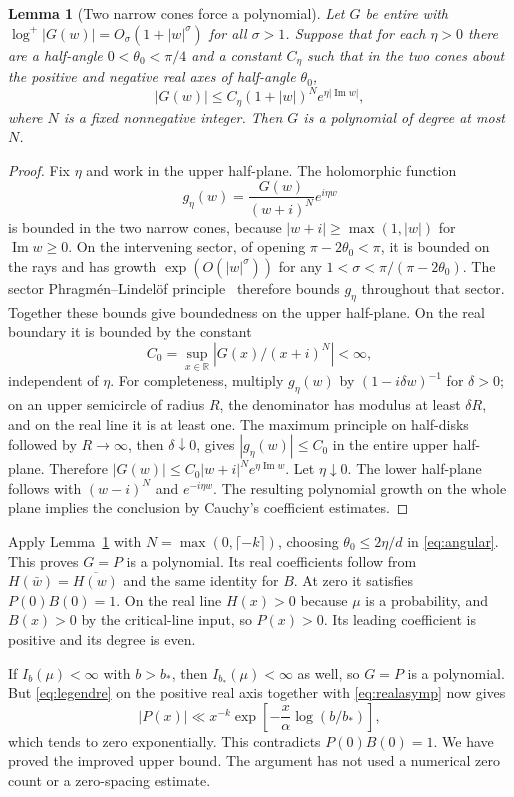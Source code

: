 \documentclass[11pt]{article}
\newtheorem{lemma}[theorem]{Lemma}
\theoremstyle{remark}\newtheorem{remark}[theorem]{Remark}
\newcommand{\R}{\mathbb R}\newcommand{\C}{\mathbb C}
\newcommand{\Ima}{\operatorname{Im}}\newcommand{\sinc}{\operatorname{sinc}}
\begin{document}
\begin{lemma}[Two narrow cones force a polynomial]\label{lem:PL}
Let $G$ be entire with $\log^+|G(w)|=O_\sigma(1+|w|^\sigma)$ for all $\sigma>1$. Suppose that for each $\eta>0$ there are a half-angle $0<\theta_0<\pi/4$ and a constant $C_\eta$ such that in the two cones about the positive and negative real axes of half-angle $\theta_0$,
\[
 |G(w)|\le C_\eta(1+|w|)^N e^{\eta|\Ima w|},
\]
where $N$ is a fixed nonnegative integer. Then $G$ is a polynomial of degree at most $N$.
\end{lemma}
\begin{proof}
Fix $\eta$ and work in the upper half-plane. The holomorphic function
\[
 g_\eta(w)=\frac{G(w)}{(w+i)^N}e^{i\eta w}
\]
is bounded in the two narrow cones, because $|w+i|\ge\max(1,|w|)$ for $\Ima w\ge0$. On the intervening sector, of opening $\pi-2\theta_0<\pi$, it is bounded on the rays and has growth $\exp(O(|w|^\sigma))$ for any $1<\sigma<\pi/(\pi-2\theta_0)$. The sector Phragm\'en--Lindel\"of principle~\cite{boas} therefore bounds $g_\eta$ throughout that sector. Together these bounds give boundedness on the upper half-plane. On the real boundary it is bounded by the constant
\[
 C_0=\sup_{x\in\R}|G(x)/(x+i)^N|<\infty,
\]
independent of $\eta$. For completeness, multiply $g_\eta(w)$ by $(1-i\delta w)^{-1}$ for $\delta>0$; on an upper semicircle of radius $R$, the denominator has modulus at least $\delta R$, and on the real line it is at least one. The maximum principle on half-disks followed by $R\to\infty$, then $\delta\downarrow0$, gives $|g_\eta(w)|\le C_0$ in the entire upper half-plane. Therefore $|G(w)|\le C_0|w+i|^N e^{\eta\Ima w}$. Let $\eta\downarrow0$. The lower half-plane follows with $(w-i)^N$ and $e^{-i\eta w}$. The resulting polynomial growth on the whole plane implies the conclusion by Cauchy's coefficient estimates.
\end{proof}

Apply Lemma~\ref{lem:PL} with $N=\max(0,\lceil-k\rceil)$, choosing $\theta_0\le 2\eta/d$ in \eqref{eq:angular}. This proves $G=P$ is a polynomial. Its real coefficients follow from $H(\bar w)=\overline{H(w)}$ and the same identity for $B$. At zero it satisfies $P(0)B(0)=1$. On the real line $H(x)>0$ because $\mu$ is a probability, and $B(x)>0$ by the critical-line input, so $P(x)>0$. Its leading coefficient is positive and its degree is even.

If $I_b(\mu)<\infty$ with $b>b_*$, then $I_{b_*}(\mu)<\infty$ as well, so $G=P$ is a polynomial. But \eqref{eq:legendre} on the positive real axis together with \eqref{eq:realasymp} now gives
\[
 |P(x)|\ll x^{-k}\exp\left[-\frac x\alpha\log(b/b_*)\right],
\]
which tends to zero exponentially. This contradicts $P(0)B(0)=1$. We have proved the improved upper bound. The argument has not used a numerical zero count or a zero-spacing estimate.
\end{document}
